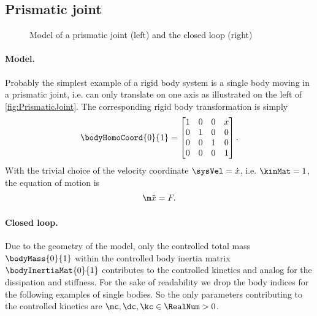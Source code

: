 \subsection{Prismatic joint}
\begin{figure}[h!]
 \centering
 
 \caption{Model of a prismatic joint (left) and the closed loop (right)}
 \label{fig:PrismaticJoint}
\end{figure}

\paragraph{Model.}
Probably the simplest example of a rigid body system is a single body moving in a prismatic joint, i.e. can only translate on one axis as illustrated on the left of \autoref{fig:PrismaticJoint}.
The corresponding rigid body transformation is simply
\begin{align}
 \bodyHomoCoord{0}{1} = \begin{bmatrix} 1 & 0 & 0 & x \\ 0 & 1 & 0 & 0 \\ 0 & 0 & 1 & 0 \\ 0 & 0 & 0 & 1\end{bmatrix}.
\end{align}
With the trivial choice of the velocity coordinate $\sysVel = \dot{x}$, i.e. $\kinMat = 1$, the equation of motion is
\begin{align}
 \m \ddot{x} = F.
\end{align}

\paragraph{Closed loop.}
Due to the geometry of the model, only the controlled total mass $\bodyMass{0}{1}$ within the controlled body inertia matrix $\bodyInertiaMat{0}{1}$ contributes to the controlled kinetics and analog for the dissipation and stiffness.
For the sake of readability we drop the body indices for the following examples of single bodies.
So the only parameters contributing to the controlled kinetics are $\mc, \dc, \kc \in \RealNum > 0$.

